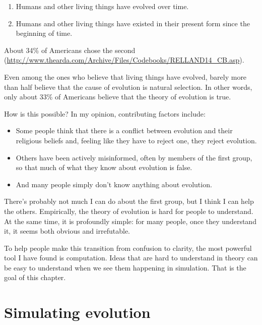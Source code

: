 \documentclass[12pt]{book}
\theoremstyle{exercise}
\begin{document}
\begin{enumerate}

\item Humans and other living things have evolved over time.

\item Humans and other living things have existed in their present form since the beginning of time.

\end{enumerate}

About 34\% of Americans chose the second (\see \url{http://www.thearda.com/Archive/Files/Codebooks/RELLAND14_CB.asp}).

Even among the ones who believe that living things have evolved, barely more than half believe that the cause of evolution is natural selection.  In other words, only about 33\% of Americans believe that the theory of evolution is true.

How is this possible?  In my opinion, contributing factors include:

\begin{itemize}

\item Some people think that there is a conflict between evolution and their religious beliefs and, feeling like they have to reject one, they reject evolution.

\item Others have been actively misinformed, often by members of the first group, so that much of what they know about evolution is false.

\item And many people simply don't know anything about evolution.

\end{itemize}

There's probably not much I can do about the first group, but I think I can help the others.  Empirically, the theory of evolution is hard for people to understand.  At the same time, it is profoundly simple: for many people, once they understand it, it seems both obvious and irrefutable.

To help people make this transition from confusion to clarity, the most powerful tool I have found is computation.  Ideas that are hard to understand in theory can be easy to understand when we see them happening in simulation.  
That is the goal of this chapter.


\section{Simulating evolution}
\end{document}
